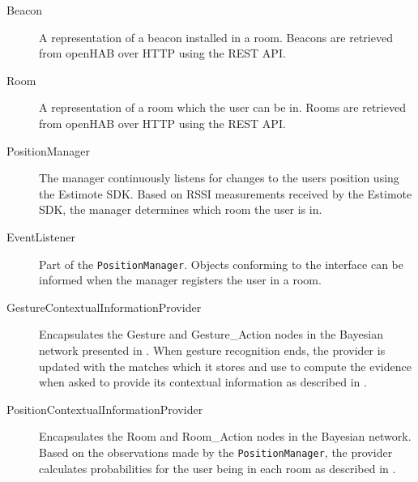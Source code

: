 \begin{description}
\item[Beacon] A representation of a beacon installed in a room. Beacons are retrieved from openHAB over HTTP using the REST API.
\item[Room] A representation of a room which the user can be in. Rooms are retrieved from openHAB over HTTP using the REST API.
\item[PositionManager] The manager continuously listens for changes to the users position using the Estimote SDK. Based on RSSI measurements received by the Estimote SDK, the manager determines which room the user is in.
\item[EventListener] Part of the \texttt{PositionManager}. Objects conforming to the interface can be informed when the manager registers the user in a room.
\item[GestureContextualInformationProvider] Encapsulates the Gesture and Gesture\_Action nodes in the Bayesian network presented in . When gesture recognition ends, the provider is updated with the matches which it stores and use to compute the evidence when asked to provide its contextual information as described in .
\item[PositionContextualInformationProvider] Encapsulates the Room and Room\_Action nodes in the Bayesian network. Based on the observations made by the \texttt{PositionManager}, the provider calculates probabilities for the user being in each room as described in .
\end{description}


